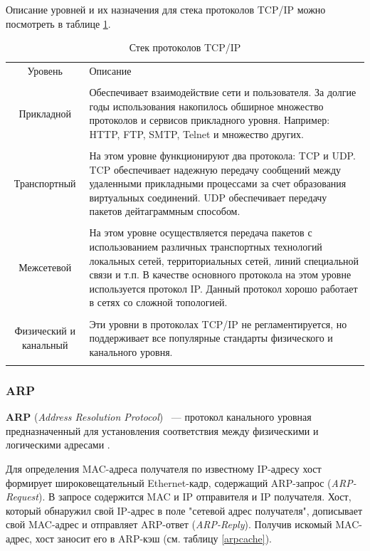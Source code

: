 Описание уровней и их назначения для стека протоколов TCP/IP можно посмотреть в таблице \ref{tcpiptable}.

\begin{table}[h!]
\caption{Стек протоколов TCP/IP}
\label{tcpiptable}
	\begin{tabular}{|c| >{\centering} m{100mm} <{\centering}|}
	\hline
	Уровень & Описание \\
	\tabularnewline
	\hline
	Прикладной & Обеспечивает взаимодействие сети и пользователя. За долгие годы использования накопилось обширное множество протоколов и сервисов прикладного уровня. Например: HTTP, FTP, SMTP, Telnet и множество других.\\
	\tabularnewline
	\hline
	Транспортный & На этом уровне функционируют два протокола: TCP и UDP. TCP обеспечивает надежную передачу сообщений между удаленными прикладными процессами за счет образования виртуальных соединений. UDP обеспечивает передачу пакетов дейтаграммным способом.\\
	\tabularnewline
	\hline
	Межсетевой & На этом уровне осуществляется передача пакетов с использованием различных транспортных технологий локальных сетей, территориальных сетей, линий специальной связи и т.п. В качестве основного протокола на этом уровне используется протокол IP. Данный протокол хорошо работает в сетях со сложной топологией.\\
	\tabularnewline
	\hline
	Физический и канальный & Эти уровни в протоколах TCP/IP не регламентируется, но поддерживает все популярные стандарты физического и канального уровня.\\
	\tabularnewline
	\hline
	\end{tabular}
\end{table}

\iffalse

\subsubsection{ARP}

\textbf{ARP} (\textit{Address Resolution Protocol}) ~--- протокол канального уровная предназначенный для установления соответствия между физическими и логическими адресами \cite{arp}.

Для определения MAC-адреса получателя по известному IP-адресу хост формирует широковещательный Ethernet-кадр, содержащий ARP-запрос (\textit{ARP-Request}). В запросе содержится MAC и IP отправителя и IP получателя. Хост, который обнаружил свой IP-адрес в поле "сетевой адрес получателя", дописывает свой MAC-адрес и отправляет ARP-ответ (\textit{ARP-Reply}). Получив искомый MAC-адрес, хост заносит его в ARP-кэш (см. таблицу \ref{arpcache}). 


